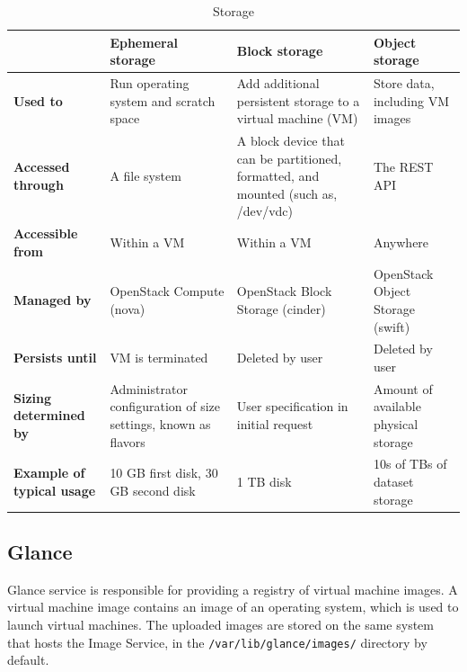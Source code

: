\begin{table}[h]
	\centering
	\begin{tabular}{|m{2cm}|m{3.8cm}|m{3.8cm}|m{3.8cm}|}
		\hline
		 & 
		\textbf{Ephemeral \newline storage} & 
		\textbf{Block storage} & 
		\textbf{Object storage}\\
		\hline
		\textbf{Used to} & 
		Run operating system and scratch space & 
		Add additional persistent storage to a virtual machine (VM) & 
		Store data, including VM images \\
		\hline
		\textbf{Accessed through} & 
		A file system & 
		A block device that can be partitioned, formatted, and mounted (such as, /dev/vdc) & 
		The REST API \\
		\hline
		\textbf{Accessible from} & 
		Within a VM & 
		Within a VM & 
		Anywhere \\
		\hline
		\textbf{Managed by} & 
		OpenStack Compute (nova) & 
		OpenStack Block Storage (cinder) & 
		OpenStack Object Storage (swift) \\
		\hline
		\textbf{Persists until} & 
		VM is terminated & 
		Deleted by user & 
		Deleted by user \\
		\hline
		\textbf{Sizing determined by} & 
		Administrator configuration of size settings, known as flavors & 
		User specification in initial request & 
		Amount of available physical storage \\
		\hline
		\textbf{Example of typical usage} & 
		10 GB first disk, 30 GB second disk & 
		1 TB disk & 
		10s of TBs of dataset storage \\
		\hline
	\end{tabular}
	\caption{Storage \cite{stodec}}
	\label{table:storage_list}
\end{table}



\subsection{Glance}
Glance service is responsible for providing a registry of virtual machine images.
A virtual machine image contains an image of an operating system, which is used to launch virtual machines. 
The uploaded images are stored on the same system that hosts the Image Service, in the \texttt{/var/lib/glance/images/} directory by default.

